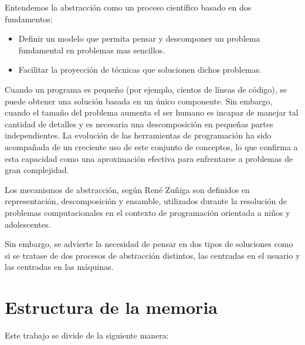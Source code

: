 \documentclass[a4paper, 12pt]{book}
\begin{document}
Entendemos la abstracción como un proceso científico basado en dos fundamentos:
\begin{itemize}
\item Definir un modelo que permita pensar y descomponer un problema fundamental en problemas mas sencillos.
\item Facilitar la proyección de técnicas que solucionen dichos problemas.
\end{itemize}

Cuando un programa es peque\~{n}o (por ejemplo, cientos de líneas de código), se puede obtener una solución basada en un único componente. Sin embargo, cuando el tama\~{n}o del problema aumenta el ser humano es incapaz de manejar tal cantidad de detalles y es necesaria una descomposición en peque\~{n}as partes independientes. La evolución de las herramientas de programación ha sido acompañada de un creciente uso de este conjunto de conceptos, lo que confirma a esta capacidad como una aproximación efectiva para enfrentarse a problemas de gran complejidad. \cite{garridoabstraccion}

Los mecanismos de abstracción, según René Zuñiga \cite{munoz2014abstraccion} son definidos en representación, descomposición y ensamble, utilizados durante la resolución de problemas computacionales en el contexto de programación orientada a niños y adolescentes. 

Sin embargo, se advierte la necesidad de pensar en dos tipos de soluciones como si se tratase de dos procesos de abstracción distintos, las centradas en el usuario y las centradas en las máquinas. \cite{wing_socialissues}

\section{Estructura de la memoria}
\label{sec:estructura}

Este trabajo se divide de la siguiente manera:
\end{document}
